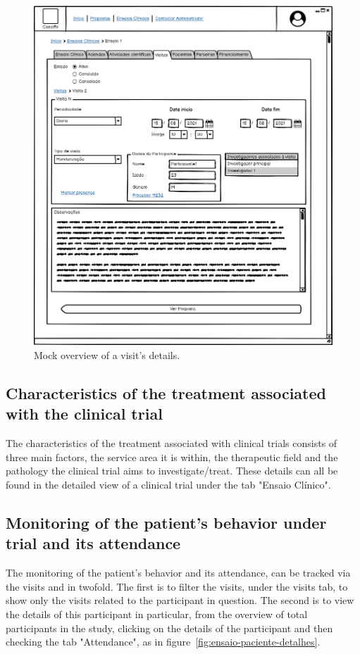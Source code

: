 \begin{figure}[H]
    \centering
    \includegraphics[scale=0.35]{images/ensaio-visita-detalhes.png}
    \caption{Mock overview of a visit's details.}
    \label{fig:ensaio-visita-detalhes}
\end{figure}


\subsection{Characteristics of the treatment associated with the clinical trial}
The characteristics of the treatment associated with clinical trials consists of three main factors, the service area it is within, the therapeutic field and the pathology the clinical trial aims to investigate/treat. These details can all be found in the detailed view of a clinical trial under the tab "Ensaio Clínico".  

\subsection{Monitoring of the patient’s behavior under trial and its attendance}
The monitoring of the patient's behavior and its attendance, can be tracked via the visits and in twofold. The first is to filter the visits, under the visits tab, to show only the visits related to the participant in question. The second is to view the details of this participant in particular, from the overview of total participants in the study, clicking on the details of the participant and then checking the tab "Attendance", as in figure~\ref{fig:ensaio-paciente-detalhes}. 


